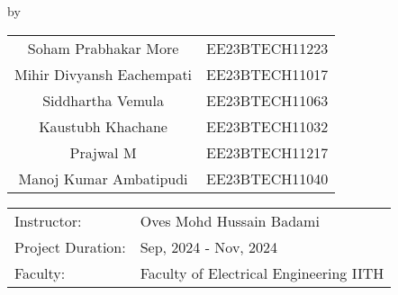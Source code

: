 \begin{titlepage}

\begin{center}

{\makeatletter
\largetitlestyle\fontsize{45}{45}\selectfont\@title
\makeatother}

{\makeatletter
\ifdefvoid{\@subtitle}{}{\bigskip\titlestyle\fontsize{20}{20}\selectfont\@subtitle}
\makeatother}

\bigskip
\bigskip

by

\bigskip
\bigskip

{\makeatletter
\largetitlestyle\fontsize{25}{25}\selectfont\@author
\makeatother}

\bigskip
\bigskip

\setlength\extrarowheight{2pt}
\begin{tabular}{c|c}
    Soham Prabhakar More & EE23BTECH11223\\ 
    Mihir Divyansh Eachempati & EE23BTECH11017\\
    Siddhartha Vemula & EE23BTECH11063\\  
    Kaustubh Khachane & EE23BTECH11032\\  
    Prajwal M & EE23BTECH11217\\  
    Manoj Kumar Ambatipudi & EE23BTECH11040 
\end{tabular}

\vfill

\begin{tabular}{ll}
    Instructor: & Oves Mohd Hussain Badami \\
    Project Duration: & Sep, 2024 - Nov, 2024 \\
    Faculty: & Faculty of Electrical Engineering IITH
\end{tabular}

\bigskip
\bigskip

\end{center}


\end{titlepage}
